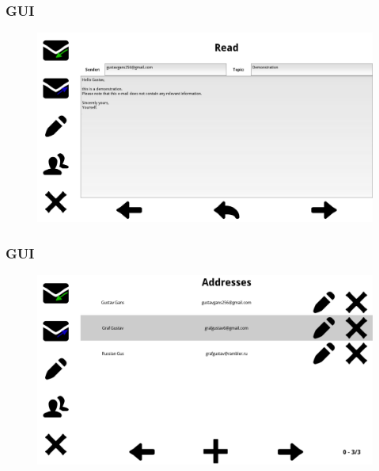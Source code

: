 \documentclass[9pt]{beamer}
\begin{document}
		    	\begin{frame}
				\frametitle{GUI}
				\begin{figure}
					\centering
					\includegraphics[scale=0.2]{Images/Read.png}
				\end{figure}
		    	\end{frame}
		    	
		    	\begin{frame}
				\frametitle{GUI}
				\begin{figure}
					\centering
					\includegraphics[scale=0.2]{Images/Addresses.png}
				\end{figure}
		    	\end{frame}
		    	
\end{document}
